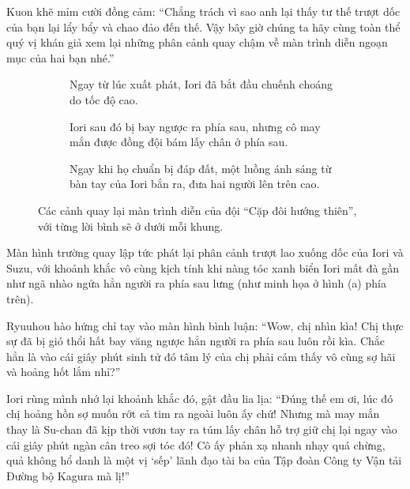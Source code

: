 \documentclass[../main.tex]{subfiles}
\begin{document}
Kuon khẽ mỉm cười đồng cảm: ``Chẳng trách vì sao anh lại thấy tư thế trượt dốc của bạn lại lẩy bẩy và chao đảo đến thế. Vậy bây giờ chúng ta hãy cùng toàn thể quý vị khán giả xem lại những phân cảnh quay chậm về màn trình diễn ngoạn mục của hai bạn nhé.''

\begin{figure}[H]
  \centering
  \begin{subfigure}[t]{0.45\textwidth}
    \centering
    \caption{Ngay từ lúc xuất phát, Iori đã bắt đầu chuếnh choáng do tốc độ cao.}
  \end{subfigure}
  \quad
  \begin{subfigure}[t]{0.45\textwidth}
    \centering
    \caption{Iori sau đó bị bay ngược ra phía sau, nhưng cô may mắn được đồng đội bám lấy chân ở phía sau.}
  \end{subfigure}
  \quad
  \begin{subfigure}[t]{0.45\textwidth}
    \centering
    \caption{Ngay khi họ chuẩn bị đáp đất, một luồng ánh sáng từ bàn tay của Iori bắn ra, đưa hai người lên trên cao.}
  \end{subfigure}
  \caption{Các cảnh quay lại màn trình diễn của đội ``Cặp đôi hướng thiên'', với từng lời bình sẽ ở dưới mỗi khung.}
\end{figure}

Màn hình trường quay lập tức phát lại phân cảnh trượt lao xuống dốc của Iori và Suzu, với khoảnh khắc vô cùng kịch tính khi nàng tóc xanh biển Iori mất đà gần như ngã nhào ngửa hẳn người ra phía sau lưng (như minh họa ở hình (a) phía trên).

Ryuuhou hào hứng chỉ tay vào màn hình bình luận: ``Wow, chị nhìn kìa! Chị thực sự đã bị gió thổi hất bay văng ngược hẳn người ra phía sau luôn rồi kìa. Chắc hẳn là vào cái giây phút sinh tử đó tâm lý của chị phải cảm thấy vô cùng sợ hãi và hoảng hốt lắm nhỉ?''

Iori rùng mình nhớ lại khoảnh khắc đó, gật đầu lia lịa: ``Đúng thế em ơi, lúc đó chị hoảng hồn sợ muốn rớt cả tim ra ngoài luôn ấy chứ! Nhưng mà may mắn thay là Su-chan đã kịp thời vươn tay ra túm lấy chân hỗ trợ giữ chị lại ngay vào cái giây phút ngàn cân treo sợi tóc đó! Cô ấy phản xạ nhanh nhạy quá chừng, quả không hổ danh là một vị `sếp' lãnh đạo tài ba của Tập đoàn Công ty Vận tải Đường bộ Kagura mà lị!''
\end{document}
